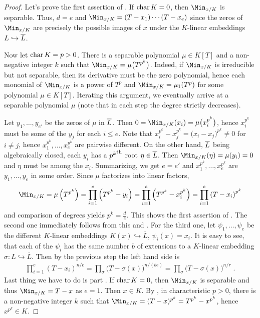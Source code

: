\documentclass[a4paper,parskip=half,numbers=enddot, DIV=12, headheight=30pt]{scrreprt}
\begin{document}
\begin{proof}
		Let's prove the first assertion of . If $\operatorname{char} K=0$, then $\Min_{x/K}$ is separable. Thus, $d=e$ and $\Min_{x/K}=(T-x_1)\cdots(T-x_e)$ since the zeros of $\Min_{x/K}$ are precisely the possible images of $x$ under the $K$-linear embeddings $L\hookrightarrow \overline L$.
		
		Now let $\operatorname{char} K=p>0$. There is a separable polynomial $\mu\in K[T]$ and a non-negative integer $k$ such that $\Min_{x/K}=\mu\big(T^{p^k}\big)$. Indeed, if $\Min_{x/K}$ is irreducible but not separable, then its derivative must be the zero polynomial, hence each monomial of $\Min_{x/K}$ is a power of $T^p$ and $\Min_{x/K}=\mu_1(T^p)$ for some polynomial $\mu\in K[T]$. Iterating this argument, we eventually arrive at a separable polynomial $\mu$ (note that in each step the degree strictly decreases). 
		
		Let $y_1,\ldots,y_{e'}$ be the zeros of $\mu$ in $\overline L$.  Then $0=\Min_{x/K}(x_i)=\mu\big(x_i^{p^k}\big)$, hence $x_i^{p^k}$ must be some of the $y_j$ for each $i\leq e$. Note that $x_i^{p^k}-x_j^{p^k}=\big(x_i-x_j\big)^{p^k}\not=0$ for $i\not=j$, hence $x_1^{p^k},\ldots,x_e^{p^k}$ are pairwise different. On the other hand, $\overline L$ being algebraically closed, each $y_i$ has a ${p^k}^{\text{th}}$ root $\eta\in\overline L$. Then $\Min_{x/K}(\eta)=\mu(y_i)=0$ and $\eta$ must be among the $x_i$. Summarizing, we get $e=e'$ and $x_1^{p^k},\ldots,x_e^{p^k}$ are $y_1,\ldots,y_e$ in some order.  Since $\mu$ factorizes into linear factors,
		\begin{align*}
			\Min_{x/K}=\mu\left(T^{p^k}\right)=\prod_{i=1}^{e}\left(T^{p^k}-y_i\right)=\prod_{i=1}^{e}\left(T^{p^k}-x_i^{p^k}\right)=\prod_{i=1}^{e}\left(T-x_i\right)^{p^k}
		\end{align*}
		and comparison of degrees yields $p^k=\frac{d}{e}$. This shows the first assertion of . The second one immediately follows from this and . For the third one, let $\psi_1,\ldots,\psi_e$ be the different $K$-linear embeddings $K(x)\hookrightarrow\overline{L}$, $\psi_i(x)=x_i$. It is easy to see, that each of the $\psi_i$ has the same number $b$ of extensions to a $K$-linear embedding $\sigma\colon L\hookrightarrow \overline{L}$. Then by the previous step the left hand side is 
		\begin{align*}
			\prod_{i=1}^e(T-x_i)^{n/e} = \prod_\sigma \big(T-\sigma(x)\big)^{n/(be)} = \prod_\sigma \big(T-\sigma(x)\big)^{n/r}\;.
		\end{align*}
		Last thing we have to do is part . If $\operatorname{char} K=0$, then $\Min_{x/K}$ is separable and thus $\Min_{x/K}=T-x$ as $e=1$. Then $x\in K$.  By , in characteristic $p>0$, there is a non-negative integer $k$ such that $\Min_{x/K}=(T-x)^{p^k}=T^{p^k}-x^{p^k}$, hence $x^{p^k}\in K$.
\end{proof}
\end{document}
